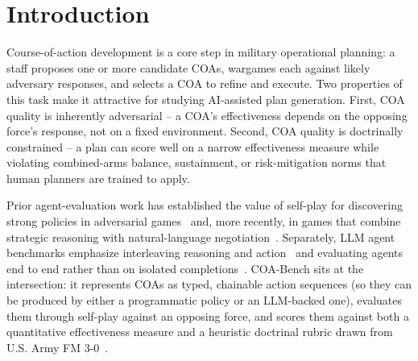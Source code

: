 \documentclass[sigconf]{acmart}
\begin{document}


\maketitle

\section{Introduction}

Course-of-action development is a core step in military operational planning: a staff proposes one or more candidate COAs, wargames each against likely adversary responses, and selects a COA to refine and execute. Two properties of this task make it attractive for studying AI-assisted plan generation. First, COA quality is inherently adversarial -- a COA's effectiveness depends on the opposing force's response, not on a fixed environment. Second, COA quality is doctrinally constrained -- a plan can score well on a narrow effectiveness measure while violating combined-arms balance, sustainment, or risk-mitigation norms that human planners are trained to apply.

Prior agent-evaluation work has established the value of self-play for discovering strong policies in adversarial games~\cite{silver2018alphazero,vinyals2019alphastar,brown2019superhuman} and, more recently, in games that combine strategic reasoning with natural-language negotiation~\cite{bakhtin2022cicero}. Separately, LLM agent benchmarks emphasize interleaving reasoning and action~\cite{yao2023react} and evaluating agents end to end rather than on isolated completions~\cite{liu2024agentbench}. COA-Bench sits at the intersection: it represents COAs as typed, chainable action sequences (so they can be produced by either a programmatic policy or an LLM-backed one), evaluates them through self-play against an opposing force, and scores them against both a quantitative effectiveness measure and a heuristic doctrinal rubric drawn from U.S. Army FM 3-0~\cite{fm30}.
\end{document}
